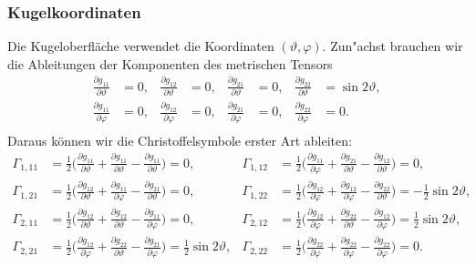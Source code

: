 \subsubsection{Kugelkoordinaten}
Die Kugeloberfläche verwendet die Koordinaten $(\vartheta,\varphi)$.
Zun"achst brauchen wir die Ableitungen der Komponenten des metrischen
Tensors
\begin{align*}
\frac{\partial g_{11}}{\partial \vartheta} &=0,
&
\frac{\partial g_{12}}{\partial \vartheta} &=0,
&
\frac{\partial g_{21}}{\partial \vartheta} &=0,
&
\frac{\partial g_{22}}{\partial \vartheta} &=\sin2\vartheta,
\\
\frac{\partial g_{11}}{\partial \varphi} &=0,
&
\frac{\partial g_{12}}{\partial \varphi} &=0,
&
\frac{\partial g_{21}}{\partial \varphi} &=0,
&
\frac{\partial g_{22}}{\partial \varphi} &=0.
\\
\end{align*}
Daraus können wir die Christoffelsymbole erster Art ableiten:
\begin{align*}
 \Gamma_{1,11}
&=
\frac12\biggl(\frac{\partial g_{11}}{\partial \vartheta}
	+ \frac{\partial g_{11}}{\partial \vartheta}
	- \frac{\partial g_{11}}{\partial \vartheta}\biggr)=0,
&\Gamma_{1,12}
&=
\frac12\biggl(\frac{\partial g_{11}}{\partial \varphi}
	+ \frac{\partial g_{21}}{\partial \vartheta}
	- \frac{\partial g_{12}}{\partial \vartheta}\biggr)=0,
\\
\Gamma_{1,21}
&=
\frac12\biggl(\frac{\partial g_{12}}{\partial \vartheta}
	+ \frac{\partial g_{11}}{\partial \varphi}
	- \frac{\partial g_{21}}{\partial \vartheta}\biggr)=0,
&\Gamma_{1,22}
&=
\frac12\biggl(\frac{\partial g_{12}}{\partial \varphi}
	+ \frac{\partial g_{12}}{\partial \varphi}
	- \frac{\partial g_{22}}{\partial \vartheta}\biggr)=-\frac12\sin2\vartheta,
\\
\Gamma_{2,11}
&=
\frac12\biggl(\frac{\partial g_{12}}{\partial \vartheta}
	+ \frac{\partial g_{12}}{\partial \vartheta}
	- \frac{\partial g_{11}}{\partial \varphi}\biggr)=0,
&\Gamma_{2,12}
&=
\frac12\biggl(\frac{\partial g_{12}}{\partial \varphi}
	+ \frac{\partial g_{22}}{\partial \vartheta}
	- \frac{\partial g_{12}}{\partial \varphi}\biggr)=\frac12\sin2\vartheta,
\\
\Gamma_{2,21}
&=
\frac12\biggl(\frac{\partial g_{12}}{\partial \varphi}
	+ \frac{\partial g_{22}}{\partial \vartheta}
	- \frac{\partial g_{21}}{\partial \varphi}\biggr)=\frac12\sin2\vartheta,
&\Gamma_{2,22}
&=
\frac12\biggl(\frac{\partial g_{22}}{\partial \varphi}
	+ \frac{\partial g_{22}}{\partial \varphi}
	- \frac{\partial g_{22}}{\partial \varphi}\biggr)=0.
\end{align*}
